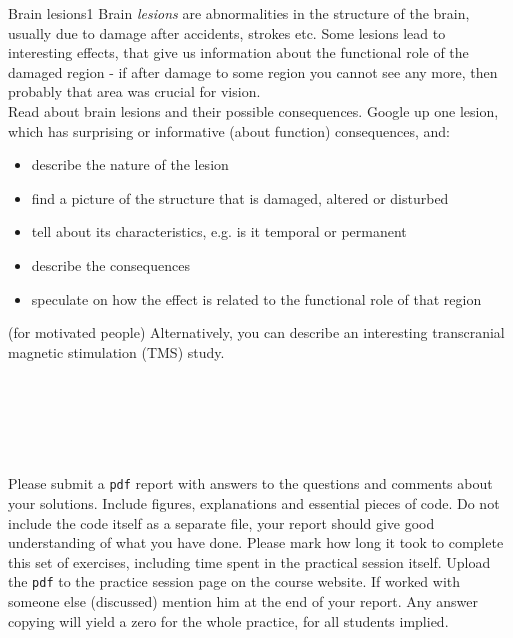 \documentclass[a4paper,11pt]{article}
\begin{document}
%
%
\begin{exercise}{4}{Brain lesions}{1}
Brain \emph{lesions} are abnormalities in the structure of the brain, usually due to damage after accidents, strokes etc. Some lesions lead to interesting effects, that give us information about the functional role of the damaged region - if after damage to some region you cannot see any more, then probably that area was crucial for vision. \\
Read about brain lesions and their possible consequences. Google up one lesion, which has surprising or informative (about function) consequences, and:
\begin{itemize}
\itemsep 0em
	\item describe the nature of the lesion
	\item find a picture of the structure that is damaged, altered or disturbed
	\item tell about its characteristics, e.g. is it temporal or permanent
	\item describe the consequences
	\item speculate on how the effect is related to the functional role of that region
\end{itemize}
(for motivated people) Alternatively, you can describe an interesting transcranial magnetic stimulation (TMS) study.
\end{exercise}


\ \\
\ \\
\ \\
\ \\
\ \\
Please submit a \texttt{pdf} report with answers to the questions and comments about your solutions. Include figures, explanations and essential pieces of code. Do not include the code itself as a separate file, your report should give good understanding of what you have done. Please mark how long it took to complete this set of exercises, including time spent in the practical session itself. Upload the \texttt{pdf} to the practice session page on the course website. If worked with someone else (discussed) mention him at the end of your report. Any answer copying will yield a zero for the whole practice, for all students implied.
\end{document}
